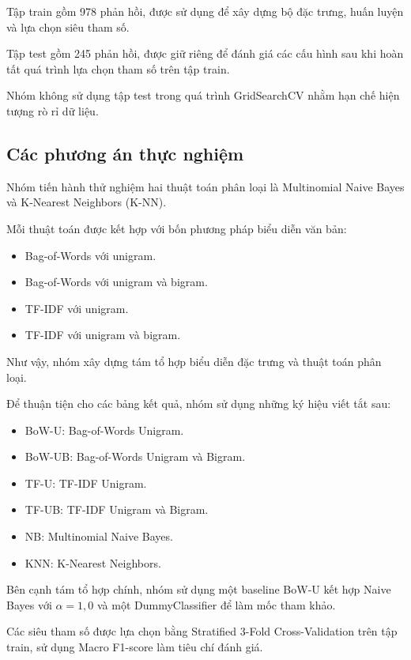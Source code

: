 Tập train gồm 978 phản hồi, được sử dụng để xây dựng
bộ đặc trưng, huấn luyện và lựa chọn siêu tham số.

Tập test gồm 245 phản hồi, được giữ riêng để đánh
giá các cấu hình sau khi hoàn tất quá trình lựa chọn
tham số trên tập train.

Nhóm không sử dụng tập test trong quá trình
GridSearchCV nhằm hạn chế hiện tượng rò rỉ dữ liệu.

\subsection{Các phương án thực nghiệm}

Nhóm tiến hành thử nghiệm hai thuật toán phân loại
là Multinomial Naive Bayes và K-Nearest Neighbors
(K-NN).

Mỗi thuật toán được kết hợp với bốn phương pháp
biểu diễn văn bản:

\begin{itemize}
    \item Bag-of-Words với unigram.
    \item Bag-of-Words với unigram và bigram.
    \item TF-IDF với unigram.
    \item TF-IDF với unigram và bigram.
\end{itemize}

Như vậy, nhóm xây dựng tám tổ hợp biểu diễn
đặc trưng và thuật toán phân loại.

Để thuận tiện cho các bảng kết quả, nhóm sử dụng
những ký hiệu viết tắt sau:

\begin{itemize}
    \item BoW-U: Bag-of-Words Unigram.
    \item BoW-UB: Bag-of-Words Unigram và Bigram.
    \item TF-U: TF-IDF Unigram.
    \item TF-UB: TF-IDF Unigram và Bigram.
    \item NB: Multinomial Naive Bayes.
    \item KNN: K-Nearest Neighbors.
\end{itemize}

Bên cạnh tám tổ hợp chính, nhóm sử dụng một
baseline BoW-U kết hợp Naive Bayes với
$\alpha=1,0$ và một DummyClassifier để
làm mốc tham khảo.

Các siêu tham số được lựa chọn bằng Stratified
3-Fold Cross-Validation trên tập train, sử dụng
Macro F1-score làm tiêu chí đánh giá.


